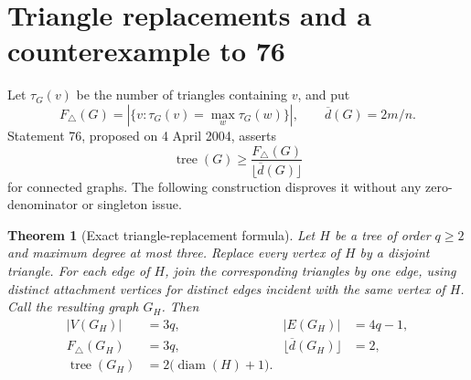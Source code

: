 \documentclass[11pt,a4paper]{article}
\newtheorem{theorem}{Theorem}[section]
\theoremstyle{remark}
\newcommand{\tree}{\operatorname{tree}}
\begin{document}
\section{Triangle replacements and a counterexample to 76}\label{sec:76}

Let $\tau_G(v)$ be the number of triangles containing $v$, and put
\[
F_\triangle(G)=|\{v:\tau_G(v)=\max_w\tau_G(w)\}|,
\qquad \overline d(G)=2m/n.
\]
Statement 76, proposed on 4 April 2004, asserts
\begin{equation}\label{eq:76}
\tree(G)\ge\frac{F_\triangle(G)}{\lfloor\overline d(G)\rfloor}
\end{equation}
for connected graphs. The following construction disproves it without
any zero-denominator or singleton issue.

\begin{theorem}[Exact triangle-replacement formula]\label{thm:triangle}
Let $H$ be a tree of order $q\ge2$ and maximum degree at most three.
Replace every vertex of $H$ by a disjoint triangle. For each edge of $H$,
join the corresponding triangles by one edge, using distinct attachment
vertices for distinct edges incident with the same vertex of $H$.
Call the resulting graph $G_H$. Then
\begin{align}
|V(G_H)|&=3q,& |E(G_H)|&=4q-1,\label{eq:trianglecount}\\
F_\triangle(G_H)&=3q,&\lfloor\overline d(G_H)\rfloor&=2,\label{eq:trianglefreq}\\
\tree(G_H)&=2\bigl(\operatorname{diam}(H)+1\bigr).\label{eq:triangletree}
\end{align}
\end{theorem}
\end{document}
